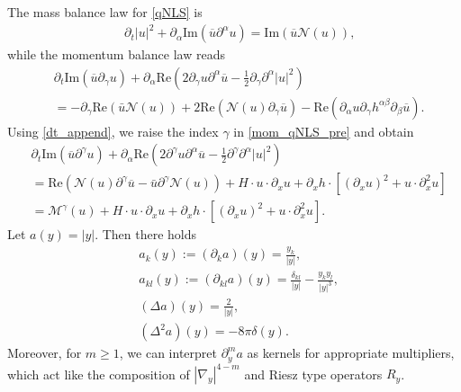 \documentclass[11pt,letterpaper,reqno]{amsart}
\numberwithin{equation}{section}
\theoremstyle{definition}
\theoremstyle{remark}
\newcommand{\pa}{\partial}
\begin{document}
The mass balance law for    \eqref{qNLS}  is
\begin{align} 
	&\,\pa_t   \left| u \right|^2  +\partial_{\alpha}\mathrm{Im} ( \overline{u}    \partial^{\alpha}u  )=\mathrm{Im} \left( \overline{u}\mathcal{N}(u) \right)  ,  \label{mass_qNLS}
\end{align}
while the momentum balance law reads
\begin{equation}
  \begin{aligned}  
	&\partial_t \mathrm{Im} ( \overline{u} \partial_\gamma u ) + \partial_{\alpha}\mathrm{Re} (2\partial_\gamma u    \partial^{\alpha} \overline{u} - \frac{1}{2}  \pa_\gamma \pa^\alpha|u|^2) \\
	&=- \partial_\gamma\mathrm{Re} ( \bar{u} \mathcal{N}(u)  )+2\mathrm{Re}  (\mathcal{N}(u)\partial_\gamma \overline{u} )-\mathrm{Re} (\partial_{\alpha} u  \partial_\gamma h^{\alpha \beta} \partial_{\beta} \overline{u}).
\end{aligned} \label{mom_qNLS_pre}
\end{equation}
Using \eqref{dt_append}, we raise the index $\gamma$ in \eqref{mom_qNLS_pre} and obtain
\begin{equation}
  \begin{aligned}  
	&\partial_t \mathrm{Im} (  \overline{u} \partial^\gamma u ) + \partial_{\alpha}\mathrm{Re} (2\partial^\gamma u    \partial^{\alpha} \overline{u} - \frac{1}{2}  \pa^\gamma \pa^\alpha|u|^2) \\
	&=     \mathrm{Re}  (\mathcal{N}(u)\partial^\gamma \overline{u} - \bar{u} \partial^\gamma\mathcal{N}(u) ) + H \cdot u \cdot \pa_x u  + \pa_x h \cdot[ (\pa_x u)^2+u\cdot \pa_x^2 u]\\
    & = \mathcal{M}^\gamma(u) + H \cdot u \cdot \pa_x u  + \pa_x h \cdot[ (\pa_x u)^2+u\cdot \pa_x^2 u].
\end{aligned} \label{mom_qNLS}
\end{equation}
Let $a(y) = |y|$. Then there holds
\begin{align*}
	&a_{k}(y) := (\pa_k a)(y) = \frac{y_k}{|y|},\\
	&a_{kl}(y) := (\pa_{kl} a)(y) = \frac{\delta_{kl}}{|y|}-\frac{y_k y_l}{|y|^3},\\
	&(\Delta a)(y) = \frac{2}{|y|},\\
	& (\Delta^2 a)(y) = -8\pi \delta(y).
\end{align*}  
Moreover, for $m\ge 1$, we can interpret $   \pa^m_y a  $
  as   kernels for appropriate multipliers, which act like the composition of  $|\nabla_y |^{4-m}$ and Riesz type operators $R_y$. 
\end{document}
